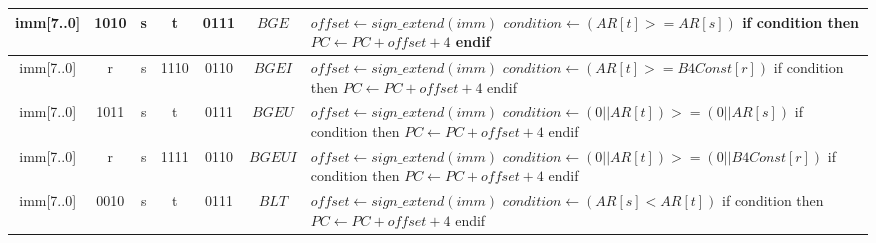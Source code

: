 \begin{smalltables}
\begin{longtable}{llllllllllllllllllllllll  p{1cm}  p{7cm} | }
		\multicolumn{8}{|c|}{imm[7..0]} & \multicolumn{4}{c|}{1010} & \multicolumn{4}{c|}{s} & \multicolumn{4}{c|}{t} & \multicolumn{4}{c|}{0111} & \multicolumn{1}{c|}{$BGE$} & $offset \leftarrow sign\_extend(imm)$ \newline $condition \leftarrow (AR[t] >= AR[s])$ \newline if condition then \newline $PC \leftarrow PC + offset + 4$ \newline endif\\ \hline
		\multicolumn{8}{|c|}{imm[7..0]} & \multicolumn{4}{c|}{r} & \multicolumn{4}{c|}{s} & \multicolumn{4}{c|}{1110} & \multicolumn{4}{c|}{0110} & \multicolumn{1}{c|}{$BGEI$} & $offset \leftarrow sign\_extend(imm)$ \newline $condition \leftarrow (AR[t] >= B4Const[r])$ \newline if condition then \newline $PC \leftarrow PC + offset + 4$ \newline endif\\ \hline
		\multicolumn{8}{|c|}{imm[7..0]} & \multicolumn{4}{c|}{1011} & \multicolumn{4}{c|}{s} & \multicolumn{4}{c|}{t} & \multicolumn{4}{c|}{0111} & \multicolumn{1}{c|}{$BGEU$} & $offset \leftarrow sign\_extend(imm)$ \newline $condition \leftarrow (0||AR[t]) >= (0||AR[s])$ \newline if condition then \newline $PC \leftarrow PC + offset + 4$ \newline endif\\ \hline
        \multicolumn{8}{|c|}{imm[7..0]} & \multicolumn{4}{c|}{r} & \multicolumn{4}{c|}{s} & \multicolumn{4}{c|}{1111} & \multicolumn{4}{c|}{0110} & \multicolumn{1}{c|}{$BGEUI$} & $offset \leftarrow sign\_extend(imm)$ \newline $condition \leftarrow (0||AR[t]) >= (0||B4Const[r])$ \newline if condition then \newline $PC \leftarrow PC + offset + 4$ \newline endif\\ \hline
		\multicolumn{8}{|c|}{imm[7..0]} & \multicolumn{4}{c|}{0010} & \multicolumn{4}{c|}{s} & \multicolumn{4}{c|}{t} & \multicolumn{4}{c|}{0111} & \multicolumn{1}{c|}{$BLT$} & $offset \leftarrow sign\_extend(imm)$ \newline $condition \leftarrow (AR[s] < AR[t])$ \newline if condition then \newline $PC \leftarrow PC + offset + 4$ \newline endif\\ \hline

\end{longtable}
\end{smalltables}
